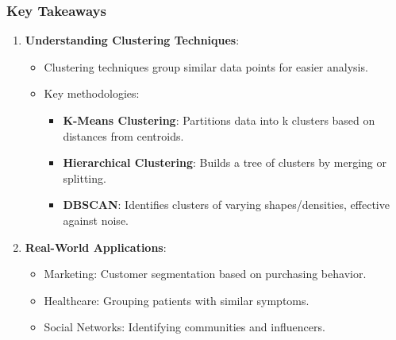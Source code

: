 \documentclass{beamer}
\begin{document}
\begin{frame}
    \frametitle{Key Takeaways}
    \begin{enumerate}
        \item \textbf{Understanding Clustering Techniques}:
        \begin{itemize}
            \item Clustering techniques group similar data points for easier analysis.
            \item Key methodologies:
            \begin{itemize}
                \item \textbf{K-Means Clustering}: Partitions data into k clusters based on distances from centroids.
                \item \textbf{Hierarchical Clustering}: Builds a tree of clusters by merging or splitting.
                \item \textbf{DBSCAN}: Identifies clusters of varying shapes/densities, effective against noise.
            \end{itemize}
        \end{itemize}
        
        \item \textbf{Real-World Applications}:
        \begin{itemize}
            \item Marketing: Customer segmentation based on purchasing behavior.
            \item Healthcare: Grouping patients with similar symptoms.
            \item Social Networks: Identifying communities and influencers.
        \end{itemize}
    \end{enumerate}
\end{frame}
\end{document}
